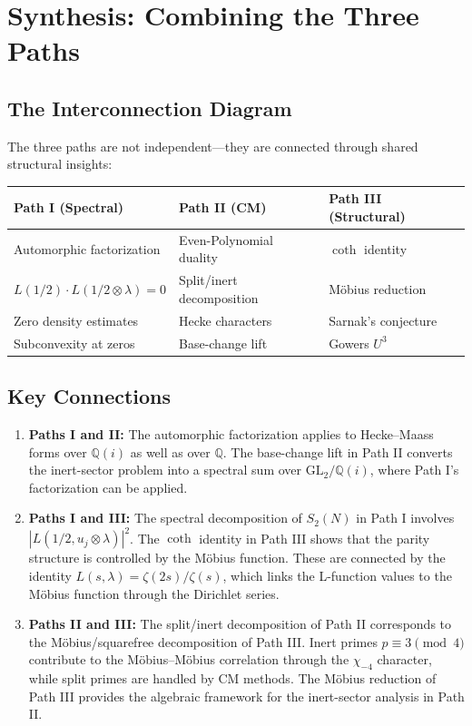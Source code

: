 \documentclass[11pt,a4paper]{article}
\theoremstyle{definition}
\begin{document}
\section{Synthesis: Combining the Three Paths}

\subsection{The Interconnection Diagram}

The three paths are not independent---they are connected through shared structural insights:

\begin{center}
\begin{tabular}{lll}
\toprule
\textbf{Path I} (Spectral) & \textbf{Path II} (CM) & \textbf{Path III} (Structural) \\
\midrule
Automorphic factorization & Even-Polynomial duality & $\coth$ identity \\
$L(1/2) \cdot L(1/2\otimes\lambda) = 0$ & Split/inert decomposition & M\"obius reduction \\
Zero density estimates & Hecke characters & Sarnak's conjecture \\
Subconvexity at zeros & Base-change lift & Gowers $U^3$ \\
\bottomrule
\end{tabular}
\end{center}

\subsection{Key Connections}

\begin{enumerate}
\item \textbf{Paths I and II:} The automorphic factorization applies to Hecke--Maass forms over $\mathbb{Q}(i)$ as well as over $\mathbb{Q}$. The base-change lift in Path II converts the inert-sector problem into a spectral sum over $\mathrm{GL}_2/\mathbb{Q}(i)$, where Path I's factorization can be applied.

\item \textbf{Paths I and III:} The spectral decomposition of $S_2(N)$ in Path I involves $|L(1/2, u_j \otimes \lambda)|^2$. The $\coth$ identity in Path III shows that the parity structure is controlled by the M\"obius function. These are connected by the identity $L(s, \lambda) = \zeta(2s)/\zeta(s)$, which links the L-function values to the M\"obius function through the Dirichlet series.

\item \textbf{Paths II and III:} The split/inert decomposition of
Path II corresponds to the M\"obius/squarefree decomposition of Path III.
Inert primes $p \equiv 3 \pmod{4}$ contribute to the M\"obius--M\"obius
correlation through the $\chi_{-4}$ character, while split primes
are handled by CM methods. The M\"obius reduction of Path III provides
the algebraic framework for the inert-sector analysis in Path II.
\end{enumerate}
\end{document}

